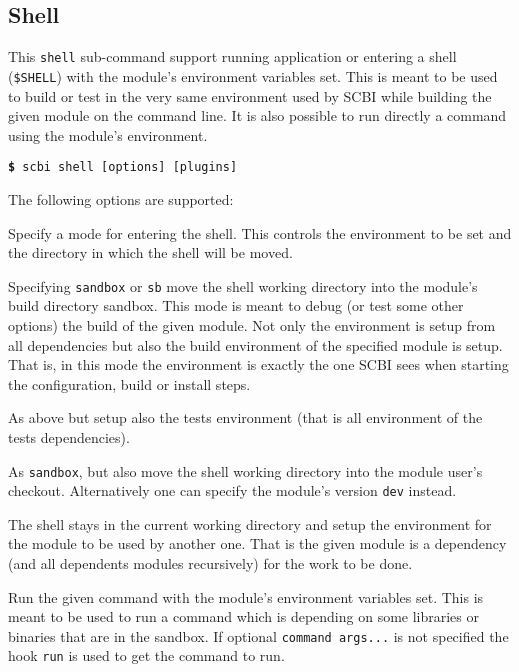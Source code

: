 \documentclass[a4paper,12pt,twoside]{article}
\newcommand{\code}[1]{\texttt{#1}}
\newcommand{\cmd}[1]{\tabto{1cm}\hspace{0.5cm}\texttt{\textbf{\$} #1}}
\newcommand{\ddash}{-{}-}
\begin{document}
\subsection{Shell}
\label{shell}

This \code{shell} sub-command support running application or entering a shell (\code{\$SHELL}) with the module's environment variables set. This is meant to be used to build or test in the very same environment used by SCBI while building the given module on the command line. It is also possible to run directly a command using the module's environment.

\cmd{scbi shell [options] [plugins]}

The following options are supported:

\begin{description}[font=\texttt]

	\item[\ddash{}mode:{[}dev|sandbox|sb|tests|use{]}] Specify a mode for entering the shell. This controls the environment to be set and the directory in which the shell will be moved.

	\begin{description}[font=\texttt]
		\item[sandbox] Specifying \code{sandbox} or \code{sb} move the shell working directory into the module's build directory sandbox. This mode is meant to debug (or test some other options) the build of the given module. Not only the environment is setup from all dependencies but also the build environment of the specified module is setup. That is, in this mode the environment is exactly the one SCBI sees when starting the configuration, build or install steps.

		\item[tests] As above but setup also the tests environment (that is all environment of the tests dependencies).

		\item[dev] As \code{sandbox}, but also move the shell working directory into the module user's checkout. Alternatively one can specify the module's version \code{dev} instead.

		\item[use|no sub-option] The shell stays in the current working directory and setup the environment for the module to be used by another one. That is the given module is a dependency (and all dependents modules recursively) for the work to be done.
	\end{description}

	\item[\ddash{}run{[}:"command args..."{]}] \label{cmd!run}Run the given command with the module's environment variables set. This is meant to be used to run a command which is depending on some libraries or binaries that are in the sandbox. If optional \code{command args...} is not specified the hook \code{run} is used to get the command to run.
\end{description}
\end{document}
